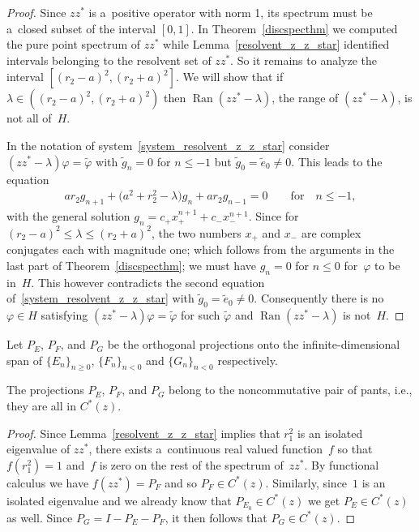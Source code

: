 \begin{proof}
Since $zz^*$ is a~positive operator with norm 1, its spectrum must be a~closed subset of the interval $[0,1]$.
In Theorem~\ref{discspecthm} we computed the pure point spectrum of $zz^*$ while Lemma~\ref{resolvent_z_z_star}
identif\/ied intervals belonging to the resolvent set of $zz^*$.
So it remains to analyze the interval $[(r_2-a)^2,(r_2+a)^2]$.
We will show that if $\lambda\in((r_2-a)^2,(r_2+a)^2)$ then $\operatorname{Ran}(zz^*-\lambda)$, the range of $(zz^*-\lambda)$, is not
all of~$H$.

In the notation of system~\eqref{system_resolvent_z_z_star} consider $(zz^*-\lambda)\varphi=\tilde{\varphi}$ with
$\tilde{g}_n=0$ for $n\leq -1$ but $\tilde{g}_0=\tilde{e}_0 \ne 0$.
This leads to the equation
\begin{gather*}
ar_2g_{n+1}+\big(a^2+r_2^2-\lambda\big)g_n+ar_2g_{n-1}=0 \qquad\text{for}\quad  n\leq -1,
\end{gather*}
with the general solution $g_n=c_+x_+^{n+1}+c_-x_-^{n+1}$.
Since for $(r_2-a)^2\leq\lambda\leq (r_2+a)^2$, the two numbers $x_+$ and $x_-$ are complex conjugates each with
magnitude one; which follows from the arguments in the last part of Theorem~\ref{discspecthm}; we must have $g_n =0$ for
$n\leq 0$ for~$\varphi$ to be in~$H$.
This however contradicts the second equation of~\eqref{system_resolvent_z_z_star} with $\tilde{g}_0=\tilde{e}_0 \ne 0$.
Consequently there is no $\varphi\in H$ satisfying $(zz^*-\lambda)\varphi=\tilde{\varphi}$ for such $\tilde{\varphi}$
and $\operatorname{Ran}(zz^*-\lambda)$ is not~$H$.
\end{proof}

Let $P_E$, $P_F$, and $P_G$ be the orthogonal projections onto the inf\/inite-dimensional span of $\{E_n\}_{n\geq 0}$,
$\{F_n\}_{n< 0}$ and $\{G_n\}_{n< 0}$ respectively.

\begin{Proposition}
The projections $P_E$, $P_F$, and $P_G$ belong to the noncommutative pair of pants, i.e., they are all in $C^*(z)$.
\end{Proposition}

\begin{proof}
Since Lemma~\ref{resolvent_z_z_star} implies that $r_1^2$ is an isolated eigenvalue of $zz^*$, there exists a~continuous
real valued function~$f$ so that $f(r_1^2)=1$ and~$f$ is zero on the rest of the spectrum of~$zz^*$.
By functional calculus we have $f(zz^*)=P_F$ and so $P_F\in C^*(z)$.
Similarly, since~$1$ is an isolated eigenvalue and we already know that $P_{E_0}\in C^*(z)$ we get $P_E\in C^*(z)$ as
well.
Since $P_G=I-P_E-P_F$, it then follows that $P_G\in C^*(z)$.
\end{proof}

